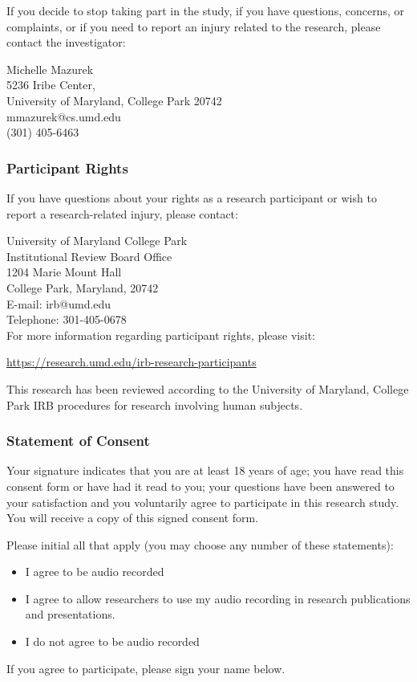 \documentclass{article}
\newcommand{\checkbox}{\text{\fboxsep=-.15pt\fbox{\rule{0pt}{1.5ex}\rule{1.5ex}{0pt}}}}
\begin{document}
If you decide to stop taking part in the study, if you have questions, concerns, or complaints, or if you need to report an injury related to the research, please contact the investigator:

{\centering
Michelle Mazurek \\
5236 Iribe Center, \\University of Maryland, College Park 20742\\
mmazurek@cs.umd.edu\\
(301) 405-6463\\}

\subsubsection{Participant Rights}
If you have questions about your rights as a research participant or wish to report a research-related injury, please contact: 

{\centering
University of Maryland College Park \\
Institutional Review Board Office\\
1204 Marie Mount Hall \\
College Park, Maryland, 20742 \\
E-mail: irb@umd.edu \\
Telephone: 301-405-0678 \\}
\vspace{5pt}
For more information regarding participant rights, please visit:

\url{https://research.umd.edu/irb-research-participants}

This research has been reviewed according to the University of Maryland, College Park IRB procedures for research involving human subjects.

\subsubsection{Statement of Consent}
Your signature indicates that you are at least 18 years of age; you have read this consent form or have had it read to you; your questions have been answered to your satisfaction and you voluntarily agree to participate in this research study. You will receive a copy of this signed consent form.

Please initial all that apply (you may choose any number of these statements):
\begin{itemize}
    \item[\checkbox] I agree to be audio recorded
    \item[\checkbox] I agree to allow researchers to use my audio recording in research publications and presentations.
\end{itemize}

\begin{itemize}
    \item[\checkbox] I do not agree to be audio recorded
\end{itemize}

If you agree to participate, please sign your name below.

 
\end{document}
